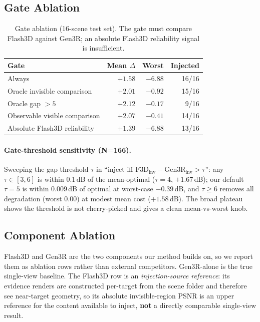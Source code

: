 \documentclass[10pt,twocolumn,letterpaper]{article}
\begin{document}
\subsection{Gate Ablation}
\label{sec:gate}
\begin{table}[t]
\centering
\small
\caption{Gate ablation (16-scene test set). The gate must compare Flash3D against
Gen3R; an absolute Flash3D reliability signal is insufficient.}
\begin{tabular}{lrrr}
\toprule
Gate & Mean $\Delta$ & Worst & Injected \\
\midrule
Always & $+1.58$ & $-6.88$ & 16/16 \\
Oracle invisible comparison & $+2.01$ & $-0.92$ & 15/16 \\
Oracle gap $>5$ & $+2.12$ & $-0.17$ & 9/16 \\
Observable visible comparison & $\mathbf{+2.07}$ & $\mathbf{-0.41}$ & 14/16 \\
Absolute Flash3D reliability & $+1.39$ & $-6.88$ & 13/16 \\
\bottomrule
\end{tabular}
\end{table}

\paragraph{Gate-threshold sensitivity (N=166).} Sweeping the gap threshold
$\tau$ in ``inject iff $\text{F3D}_{\text{inv}}-\text{Gen3R}_{\text{inv}}>\tau$'':
any $\tau\in[3,6]$ is within 0.1\,dB of the mean-optimal ($\tau{=}4$, $+1.67$\,dB);
our default $\tau{=}5$ is within 0.009\,dB of optimal at worst-case $-0.39$\,dB,
and $\tau\ge6$ removes all degradation (worst 0.00) at modest mean cost
($+1.58$\,dB). The broad plateau shows the threshold is not cherry-picked and
gives a clean mean-vs-worst knob.

\subsection{Component Ablation}
\label{sec:component}
Flash3D and Gen3R are the two components our method builds on, so we report them
as ablation rows rather than external competitors. Gen3R-alone is the true
single-view baseline. The Flash3D row is an \emph{injection-source reference}:
its evidence renders are constructed per-target from the scene folder and
therefore see near-target geometry, so its absolute invisible-region PSNR is an
upper reference for the content available to inject, \textbf{not} a directly
comparable single-view result.
\end{document}
